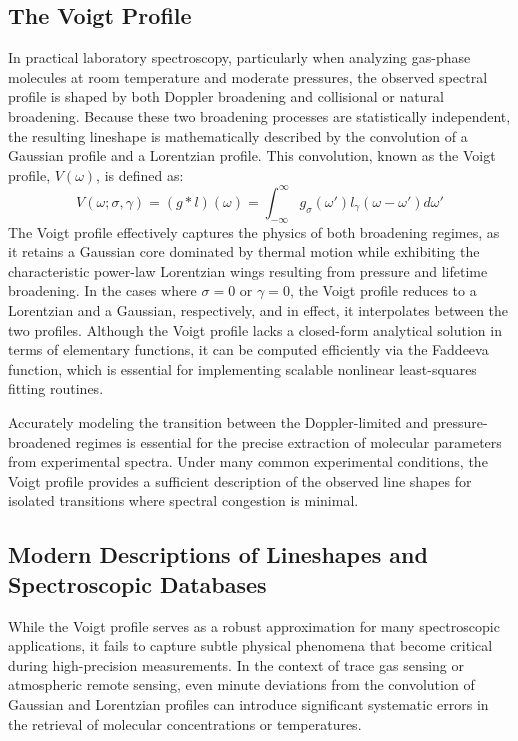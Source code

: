 \documentclass[12pt]{report}
\begin{document}
	\subsection{The Voigt Profile}
	In practical laboratory spectroscopy, particularly when analyzing gas-phase molecules at room temperature and moderate pressures, the observed spectral profile is shaped by both Doppler broadening and collisional or natural broadening. Because these two broadening processes are statistically independent, the resulting lineshape is mathematically described by the convolution of a Gaussian profile and a Lorentzian profile. This convolution, known as the Voigt profile, $V(\omega)$, is defined as:
	\begin{equation}
		V(\omega; \sigma, \gamma) = (g * l)(\omega) = \int_{-\infty}^{\infty} g_\sigma(\omega') l_\gamma(\omega - \omega') d\omega'
	\end{equation}
	The Voigt profile effectively captures the physics of both broadening regimes, as it retains a Gaussian core dominated by thermal motion while exhibiting the characteristic power-law Lorentzian wings resulting from pressure and lifetime broadening. In the cases where $\sigma=0$ or $\gamma=0$, the Voigt profile reduces to a Lorentzian and a Gaussian, respectively, and in effect, it interpolates between the two profiles. Although the Voigt profile lacks a closed-form analytical solution in terms of elementary functions, it can be computed efficiently via the Faddeeva function, which is essential for implementing scalable nonlinear least-squares fitting routines.
	
	Accurately modeling the transition between the Doppler-limited and pressure-broadened regimes is essential for the precise extraction of molecular parameters from experimental spectra. Under many common experimental conditions, the Voigt profile provides a sufficient description of the observed line shapes for isolated transitions where spectral congestion is minimal.
	
	\subsection{Modern Descriptions of Lineshapes and Spectroscopic Databases}
	While the Voigt profile serves as a robust approximation for many spectroscopic applications, it fails to capture subtle physical phenomena that become critical during high-precision measurements. In the context of trace gas sensing or atmospheric remote sensing, even minute deviations from the convolution of Gaussian and Lorentzian profiles can introduce significant systematic errors in the retrieval of molecular concentrations or temperatures.
	
\end{document}
